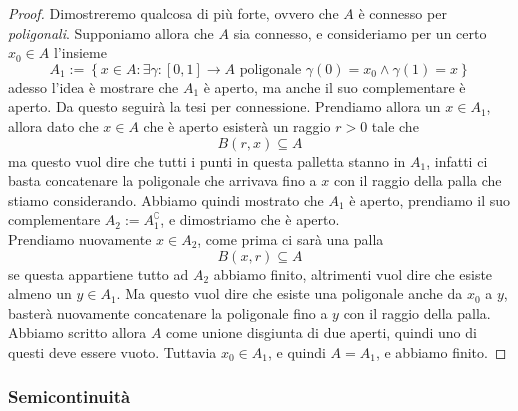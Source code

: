 \documentclass[11pt]{scrartcl}
\begin{document}
	\begin{proof}
		Dimostreremo qualcosa di più forte, ovvero che $A$ è connesso per \textit{poligonali}. Supponiamo allora che $A$ sia connesso, e consideriamo per un certo $x_0\in A$ l'insieme
		$$A_1:=\left\{x\in A:\exists \gamma:[0,1]\to A \text{ poligonale }\gamma(0)=x_0\land \gamma(1)=x\right\}$$
		adesso l'idea è mostrare che $A_1$ è aperto, ma anche il suo complementare è aperto. Da questo seguirà la tesi per connessione. Prendiamo allora un $x\in A_1$, allora dato che $x\in A$ che è aperto esisterà un raggio $r>0$ tale che
		$$B(r,x)\subseteq A$$
		ma questo vuol dire che tutti i punti in questa palletta stanno in $A_1$, infatti ci basta concatenare la poligonale che arrivava fino a $x$ con il raggio della palla che stiamo considerando. Abbiamo quindi mostrato che $A_1$ è aperto, prendiamo il suo complementare $A_2:=A_1^\complement$, e dimostriamo che è aperto. \\
		Prendiamo nuovamente $x\in A_2$, come prima ci sarà una palla
		$$B(x,r)\subseteq A$$
		se questa appartiene tutto ad $A_2$ abbiamo finito, altrimenti vuol dire che esiste almeno un $y\in A_1$. Ma questo vuol dire che esiste una poligonale anche da $x_0$ a $y$, basterà nuovamente concatenare la poligonale fino a $y$ con il raggio della palla. \\
		Abbiamo scritto allora $A$ come unione disgiunta di due aperti, quindi uno di questi deve essere vuoto. Tuttavia $x_0\in A_1$, e quindi $A=A_1$, e abbiamo finito.
	\end{proof}
	
	\subsubsection{Semicontinuità}
	
\end{document}

